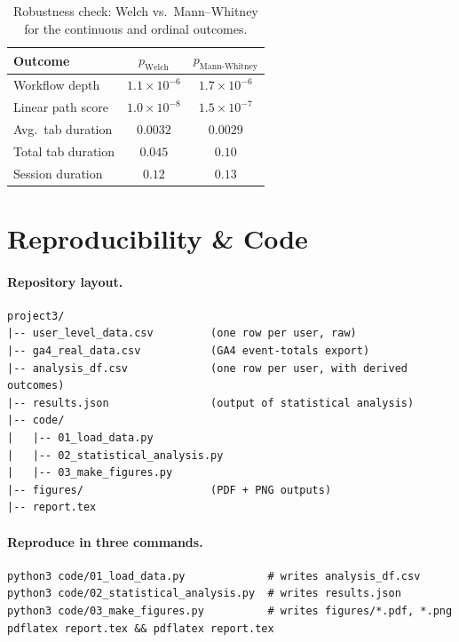 \documentclass[11pt,a4paper]{article}
\begin{document}
\begin{table}[ht]
\centering\small
\renewcommand{\arraystretch}{1.15}
\caption{Robustness check: Welch vs.\ Mann--Whitney for the
continuous and ordinal outcomes.}
\begin{tabular}{@{}lcc@{}}
\toprule
\textbf{Outcome} & $p_{\text{Welch}}$ & $p_{\text{Mann-Whitney}}$ \\
\midrule
Workflow depth                & $1.1\times10^{-6}$ & $1.7\times10^{-6}$ \\
Linear path score             & $1.0\times10^{-8}$ & $1.5\times10^{-7}$ \\
Avg.\ tab duration            & $0.0032$           & $0.0029$ \\
Total tab duration            & $0.045$            & $0.10$ \\
Session duration              & $0.12$             & $0.13$ \\
\bottomrule
\end{tabular}
\end{table}

\clearpage
\section{Reproducibility \& Code}
\label{app:code}

\paragraph{Repository layout.}
\begin{verbatim}
project3/
|-- user_level_data.csv         (one row per user, raw)
|-- ga4_real_data.csv           (GA4 event-totals export)
|-- analysis_df.csv             (one row per user, with derived outcomes)
|-- results.json                (output of statistical analysis)
|-- code/
|   |-- 01_load_data.py
|   |-- 02_statistical_analysis.py
|   |-- 03_make_figures.py
|-- figures/                    (PDF + PNG outputs)
|-- report.tex
\end{verbatim}

\paragraph{Reproduce in three commands.}
\begin{verbatim}
python3 code/01_load_data.py             # writes analysis_df.csv
python3 code/02_statistical_analysis.py  # writes results.json
python3 code/03_make_figures.py          # writes figures/*.pdf, *.png
pdflatex report.tex && pdflatex report.tex
\end{verbatim}
\end{document}
